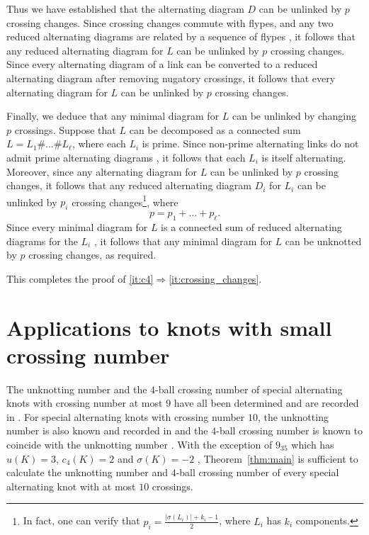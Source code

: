 \documentclass[a4paper,11pt]{amsart}
\theoremstyle{definition}
\theoremstyle{remark}
\numberwithin{equation}{section}
\begin{document}
Thus we have established that the alternating diagram $D$ can be unlinked by $p$ crossing changes. Since crossing changes commute with flypes, and any two reduced alternating diagrams are related by a sequence of flypes \cite{Menasco1993flyping}, it follows that any reduced alternating diagram for $L$ can be unlinked by $p$ crossing changes. Since every alternating diagram of a link can be converted to a reduced alternating diagram after removing nugatory crossings, it follows that every alternating diagram for $L$ can be unlinked by $p$ crossing changes.

Finally, we deduce that any minimal diagram for $L$ can be unlinked by changing $p$ crossings. Suppose that $L$ can be decomposed as a connected sum $L=L_1\# \dots \# L_\ell$, where each $L_i$ is prime. Since non-prime alternating links do not admit prime alternating diagrams \cite{Menasco1984incompressible}, it follows that each $L_i$ is itself alternating. Moreover, since any alternating diagram for $L$ can be unlinked by $p$ crossing changes, it follows that any reduced alternating diagram $D_i$ for $L_i$ can be unlinked by $p_i$ crossing changes\footnote{In fact, one can verify that $p_i=\frac{|\sigma(L_i)|+k_i-1}{2}$, where $L_i$ has $k_i$ components.}, where   
\[
p=p_1+\dots +p_\ell.
\]
Since every minimal diagram for $L$ is a connected sum of reduced alternating diagrams for the $L_i$ \cite{Murasugi1987Jones}, it follows that any minimal diagram for $L$ can be unknotted by $p$ crossing changes, as required.

This completes the proof of \eqref{it:c4}$\Rightarrow$\eqref{it:crossing_changes}.

\section{Applications to knots with small crossing number}\label{sec:calculations}
The unknotting number and the $4$-ball crossing number of special alternating knots with crossing number at most $9$ have all been determined and are recorded in \cite{knotinfo}.  For special alternating knots with crossing number $10$, the unknotting number is also known and recorded in \cite{knotinfo} and the $4$-ball crossing number is known to coincide with the unknotting number \cite{Owens2016Immersed}. With the exception of $9_{35}$ which has $u(K)=3$, $c_4(K)=2$ and $\sigma(K)=-2$ \cite{Owens2016Immersed}, Theorem~\ref{thm:main} is sufficient to calculate the unknotting number and $4$-ball crossing number of every special alternating knot with at most $10$ crossings.
\end{document}
